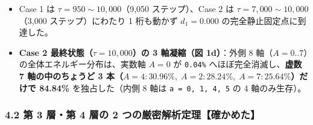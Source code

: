 \documentclass[
  a4paper,
]{ltjsarticle}
\providecommand{\tightlist}{%
  \setlength{\itemsep}{0pt}\setlength{\parskip}{0pt}}
\begin{document}
\begin{itemize}
\tightlist
\item
  Case 1 は \(\tau = 950 \sim 10,000\)（9,050 ステップ）、Case 2 は
  \(\tau = 7,000 \sim 10,000\)（3,000 ステップ）にわたり 1 桁も動かず
  \(d_1 = 0.000\) の完全静止固定点に到達した。
\item
  \textbf{Case 2 最終状態（\(\tau = 10,000\)）の 3 軸凝縮（図
  1d）}：外側 8 軸（\(A = 0..7\)）の全体エネルギー分布は、実数軸
  \(A = 0\) が \texttt{0.04\%} へほぼ完全消滅し、\textbf{虚数 7
  軸の中のちょうど 3
  本（\(A = 4: 30.96\%,\; A = 2: 28.24\%,\; A = 7: 25.64\%\)）だけで
  84.84\%} を独占した（内側 8 軸は \texttt{a\ =\ 0,\ 1,\ 4,\ 5} の 4
  軸のみ生存）。
\end{itemize}

\subsubsection{4.2 第 3 層・第 4 層の 2
つの厳密解析定理【確かめた】}\label{ux7b2c-3-ux5c64ux7b2c-4-ux5c64ux306e-2-ux3064ux306eux53b3ux5bc6ux89e3ux6790ux5b9aux7406ux78baux304bux3081ux305f}
\end{document}
